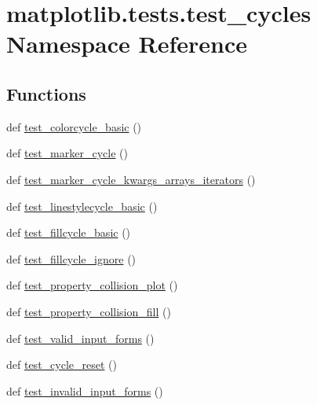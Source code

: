 \hypertarget{namespacematplotlib_1_1tests_1_1test__cycles}{}\section{matplotlib.\+tests.\+test\+\_\+cycles Namespace Reference}
\label{namespacematplotlib_1_1tests_1_1test__cycles}
\subsection*{Functions}
\begin{DoxyCompactItemize}
\item 
def \hyperlink{namespacematplotlib_1_1tests_1_1test__cycles_a06b7aeac02cf672f2575ad167cd51262}{test\+\_\+colorcycle\+\_\+basic} ()
\item 
def \hyperlink{namespacematplotlib_1_1tests_1_1test__cycles_ae1fd0b5e72e2249e245637e3f4b7f050}{test\+\_\+marker\+\_\+cycle} ()
\item 
def \hyperlink{namespacematplotlib_1_1tests_1_1test__cycles_a9630e8d0016782a713d50bde8fe94990}{test\+\_\+marker\+\_\+cycle\+\_\+kwargs\+\_\+arrays\+\_\+iterators} ()
\item 
def \hyperlink{namespacematplotlib_1_1tests_1_1test__cycles_a8708d044d36e8ed7c44fe6682539bc07}{test\+\_\+linestylecycle\+\_\+basic} ()
\item 
def \hyperlink{namespacematplotlib_1_1tests_1_1test__cycles_a651b0c97b239d90fecb42228de338474}{test\+\_\+fillcycle\+\_\+basic} ()
\item 
def \hyperlink{namespacematplotlib_1_1tests_1_1test__cycles_a3f4f2deaac0accfbaf75512b7af4a0cf}{test\+\_\+fillcycle\+\_\+ignore} ()
\item 
def \hyperlink{namespacematplotlib_1_1tests_1_1test__cycles_a5ee2a2e31e8bac6f2a8090d95bc0d449}{test\+\_\+property\+\_\+collision\+\_\+plot} ()
\item 
def \hyperlink{namespacematplotlib_1_1tests_1_1test__cycles_a2510d72072c07b97e6c147dc27186430}{test\+\_\+property\+\_\+collision\+\_\+fill} ()
\item 
def \hyperlink{namespacematplotlib_1_1tests_1_1test__cycles_ab6dcc8a99dd1ce3bc2f9eb6234b3c633}{test\+\_\+valid\+\_\+input\+\_\+forms} ()
\item 
def \hyperlink{namespacematplotlib_1_1tests_1_1test__cycles_a3949197c919950074abcfd08ee3d94f9}{test\+\_\+cycle\+\_\+reset} ()
\item 
def \hyperlink{namespacematplotlib_1_1tests_1_1test__cycles_afb66d2359ea4c8f836a08e887d4a3a53}{test\+\_\+invalid\+\_\+input\+\_\+forms} ()
\end{DoxyCompactItemize}


